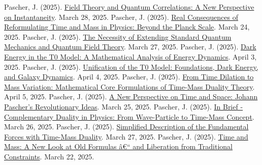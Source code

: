 ﻿\documentclass[12pt,a4paper]{article}
\begin{document}
\begin{thebibliography}{99}
			 Pascher, J. (2025). \href{https://github.com/jpascher/T0-Time-Mass-Duality/tree/main/2/pdf/English/FeldtheorieQuantenEn.pdf}{Field Theory and Quantum Correlations: A New Perspective on Instantaneity}. March 28, 2025.
			 Pascher, J. (2025). \href{https://github.com/jpascher/T0-Time-Mass-Duality/tree/main/2/pdf/English/JenseitsPlanckEn.pdf}{Real Consequences of Reformulating Time and Mass in Physics: Beyond the Planck Scale}. March 24, 2025.
			 Pascher, J. (2025). \href{https://github.com/jpascher/T0-Time-Mass-Duality/tree/main/2/pdf/English/NotwendigkeitQMErweiterungEn.pdf}{The Necessity of Extending Standard Quantum Mechanics and Quantum Field Theory}. March 27, 2025.
			 Pascher, J. (2025). \href{https://github.com/jpascher/T0-Time-Mass-Duality/tree/main/2/pdf/English/MathEnergiedynamikEn.pdf}{Dark Energy in the T0 Model: A Mathematical Analysis of Energy Dynamics}. April 3, 2025.
			 Pascher, J. (2025). \href{https://github.com/jpascher/T0-Time-Mass-Duality/tree/main/2/pdf/English/T0VereinheitlichungDEGalEn.pdf}{Unification of the T0 Model: Foundations, Dark Energy, and Galaxy Dynamics}. April 4, 2025.
			 Pascher, J. (2025). \href{https://github.com/jpascher/T0-Time-Mass-Duality/tree/main/2/pdf/English/MathZeitMasseLagrangeEn.pdf}{From Time Dilation to Mass Variation: Mathematical Core Formulations of Time-Mass Duality Theory}. April 5, 2025.
			 Pascher, J. (2025). \href{https://github.com/jpascher/T0-Time-Mass-Duality/tree/main/2/pdf/English/ZeitRaumPascherEn.pdf}{A New Perspective on Time and Space: Johann Pascher's Revolutionary Ideas}. March 25, 2025.
			 Pascher, J. (2025). \href{https://github.com/jpascher/T0-Time-Mass-Duality/tree/main/2/pdf/English/KurzKomplementDualPhysikEn.pdf}{In Brief - Complementary Duality in Physics: From Wave-Particle to Time-Mass Concept}. March 26, 2025.
			 Pascher, J. (2025). \href{https://github.com/jpascher/T0-Time-Mass-Duality/tree/main/2/pdf/English/VierKraefteZeitMasseEn.pdf}{Simplified Description of the Fundamental Forces with Time-Mass Duality}. March 27, 2025.
			 Pascher, J. (2025). \href{https://github.com/jpascher/T0-Time-Mass-Duality/tree/main/2/pdf/English/ZeitMasseNeuerBlickEn.pdf}{Time and Mass: A New Look at Old Formulas â€“ and Liberation from Traditional Constraints}. March 22, 2025.

\end{thebibliography}
\end{document}
